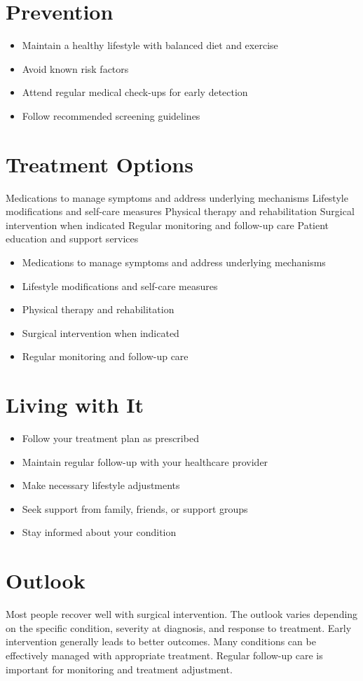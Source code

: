 \section{Prevention}
\begin{itemize}[noitemsep]
  \item Maintain a healthy lifestyle with balanced diet and exercise
  \item Avoid known risk factors
  \item Attend regular medical check-ups for early detection
  \item Follow recommended screening guidelines
\end{itemize}
\section{Treatment Options}
Medications to manage symptoms and address underlying mechanisms Lifestyle modifications and self-care measures Physical therapy and rehabilitation Surgical intervention when indicated Regular monitoring and follow-up care Patient education and support services

\begin{itemize}[noitemsep]
  \item Medications to manage symptoms and address underlying mechanisms
  \item Lifestyle modifications and self-care measures
  \item Physical therapy and rehabilitation
  \item Surgical intervention when indicated
  \item Regular monitoring and follow-up care
\end{itemize}
\section{Living with It}
\begin{itemize}[noitemsep]
  \item Follow your treatment plan as prescribed
  \item Maintain regular follow-up with your healthcare provider
  \item Make necessary lifestyle adjustments
  \item Seek support from family, friends, or support groups
  \item Stay informed about your condition
\end{itemize}
\section{Outlook}
Most people recover well with surgical intervention. The outlook varies depending on the specific condition, severity at diagnosis, and response to treatment. Early intervention generally leads to better outcomes. Many conditions can be effectively managed with appropriate treatment. Regular follow-up care is important for monitoring and treatment adjustment.
